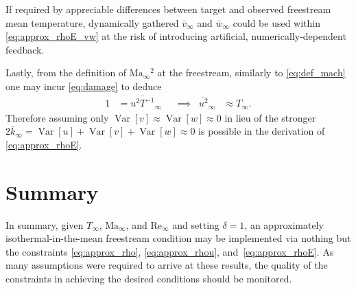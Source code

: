 \documentclass[letterpaper,11pt,nointlimits,reqno]{amsart}
\newcommand{\Mach}[1][]{\mbox{Ma}_{#1}}
\newcommand{\Reynolds}[1][]{\mbox{Re}_{#1}}
\newcommand{\Var}[1]{\ensuremath{\operatorname{Var}\left[{#1}\right]}}
\begin{document}
If required by appreciable differences between target and observed freestream
mean temperature, dynamically gathered $\bar{v}_\infty$ and $\bar{w}_\infty$
could be used within \eqref{eq:approx_rhoE_vw} at the risk of introducing
artificial, numerically-dependent feedback.

Lastly, from the definition of $\Mach[\infty]{}^2$ at the freestream, similarly
to \eqref{eq:def_mach} one may incur \eqref{eq:damage} to deduce
\begin{align}
  \label{eq:def_mach2}
  1 &= \overline{u^2 T^{-1}}_\infty
  &
  &\implies
  &
  \overline{u^2}_\infty &\approx T_\infty
  .
\end{align}
Therefore assuming only $\Var{v} \approx \Var{w} \approx 0$ in lieu of the
stronger $2 \bar{k}_\infty = \Var{u} + \Var{v} + \Var{w} \approx 0$ is possible
in the derivation of \eqref{eq:approx_rhoE}.

\section{Summary}

In summary, given $T_\infty$, $\Mach[\infty]{}$, and $\Reynolds[\infty]{}$ and
setting $\delta=1$, an approximately isothermal-in-the-mean freestream
condition may be implemented via nothing but the constraints
\eqref{eq:approx_rho}, \eqref{eq:approx_rhou}, and~\eqref{eq:approx_rhoE}.  As
many assumptions were required to arrive at these results, the quality of the
constraints in achieving the desired conditions should be monitored.
\end{document}
